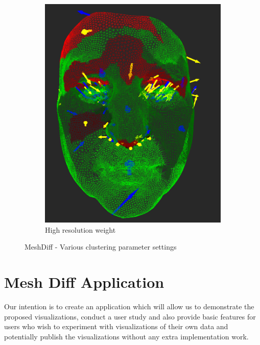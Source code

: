 \begin{figure}[h]
\begin{subfigure}{0.3\textwidth}
	\includegraphics[width=\textwidth]{./img/meshdiff-high_resolution.PNG}
	\caption{High resolution weight}
	\label{fig:meshdiff_high_resolution}
	\end{subfigure}
\caption{MeshDiff - Various clustering parameter settings}
\end{figure}

\section{Mesh Diff Application}

Our intention is to create an application which will allow us to demonstrate the proposed visualizations, conduct a user study and also provide basic features for users who wish to experiment with visualizations of their own data and potentially publish the visualizations without any extra implementation work.

